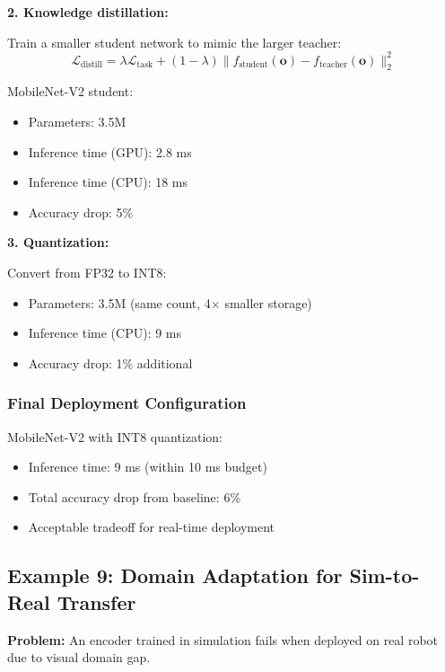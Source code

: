 \textbf{2. Knowledge distillation:}

Train a smaller student network to mimic the larger teacher:
\begin{equation}
\mathcal{L}_{\text{distill}} = \lambda \mathcal{L}_{\text{task}} + (1-\lambda) \| f_{\text{student}}(\mathbf{o}) - f_{\text{teacher}}(\mathbf{o}) \|_2^2
\label{eq:distillation}
\end{equation}

MobileNet-V2 student:
\begin{itemize}
    \item Parameters: 3.5M
    \item Inference time (GPU): 2.8 ms
    \item Inference time (CPU): 18 ms
    \item Accuracy drop: 5\%
\end{itemize}

\textbf{3. Quantization:}

Convert from FP32 to INT8:
\begin{itemize}
    \item Parameters: 3.5M (same count, 4$\times$ smaller storage)
    \item Inference time (CPU): 9 ms
    \item Accuracy drop: 1\% additional
\end{itemize}

\subsubsection{Final Deployment Configuration}

MobileNet-V2 with INT8 quantization:
\begin{itemize}
    \item Inference time: 9 ms (within 10 ms budget)
    \item Total accuracy drop from baseline: 6\%
    \item Acceptable tradeoff for real-time deployment
\end{itemize}


\subsection{Example 9: Domain Adaptation for Sim-to-Real Transfer}

\textbf{Problem:} An encoder trained in simulation fails when deployed on real robot due to visual domain gap.

